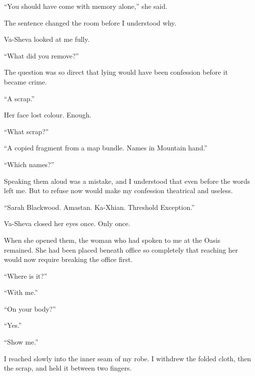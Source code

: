 ``You should have come with memory alone,'' she said.\par

The sentence changed the room before I understood why.\par

Va-Sheva looked at me fully.\par

``What did you remove?''\par

The question was so direct that lying would have been confession before it became crime.\par

``A scrap.''\par

Her face lost colour. Enough.\par

``What scrap?''\par

``A copied fragment from a map bundle. Names in Mountain hand.''\par

``Which names?''\par

Speaking them aloud was a mistake, and I understood that even before the words left me. But to refuse now would make my confession theatrical and useless.\par

``Sarah Blackwood. Amastan. Ka-Xhian. Threshold Exception.''\par

Va-Sheva closed her eyes once. Only once.\par

When she opened them, the woman who had spoken to me at the Oasis remained. She had been placed beneath office so completely that reaching her would now require breaking the office first.\par

``Where is it?''\par

``With me.''\par

``On your body?''\par

``Yes.''\par

``Show me.''\par

I reached slowly into the inner seam of my robe. I withdrew the folded cloth, then the scrap, and held it between two fingers.\par

